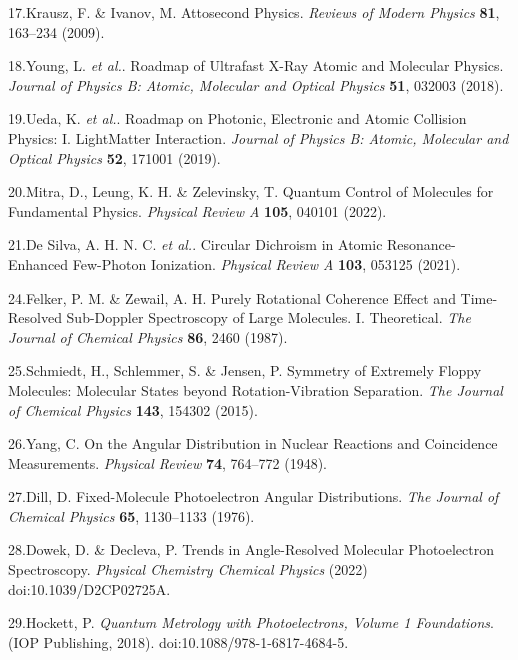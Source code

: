 \documentclass[10pt]{article}
\begin{document}
\label{csl:17}17.Krausz, F. \& Ivanov, M. {Attosecond Physics}. \textit{Reviews of Modern Physics} \textbf{81}, 163–234 (2009).

\label{csl:18}18.Young, L. \textit{et al.}. {Roadmap of Ultrafast X-Ray Atomic and Molecular Physics}. \textit{Journal of Physics B: Atomic, Molecular and Optical Physics} \textbf{51}, 032003 (2018).

\label{csl:19}19.Ueda, K. \textit{et al.}. {Roadmap on Photonic, Electronic and Atomic Collision Physics: {{I}}. {{Light}}\textendash Matter Interaction}. \textit{Journal of Physics B: Atomic, Molecular and Optical Physics} \textbf{52}, 171001 (2019).

\label{csl:20}20.Mitra, D., Leung, K. H. \& Zelevinsky, T. {Quantum Control of Molecules for Fundamental Physics}. \textit{Physical Review A} \textbf{105}, 040101 (2022).

\label{csl:21}21.De Silva, A. H. N. C. \textit{et al.}. {Circular Dichroism in Atomic Resonance-Enhanced Few-Photon Ionization}. \textit{Physical Review A} \textbf{103}, 053125 (2021).

\label{csl:24}24.Felker, P. M. \& Zewail, A. H. {Purely Rotational Coherence Effect and Time-Resolved Sub-{{Doppler}} Spectroscopy of Large Molecules. {{I}}. {{Theoretical}}}. \textit{The Journal of Chemical Physics} \textbf{86}, 2460 (1987).

\label{csl:25}25.Schmiedt, H., Schlemmer, S. \& Jensen, P. {Symmetry of Extremely Floppy Molecules: {{Molecular}} States beyond Rotation-Vibration Separation}. \textit{The Journal of Chemical Physics} \textbf{143}, 154302 (2015).

\label{csl:26}26.Yang, C. {On the {{Angular Distribution}} in {{Nuclear Reactions}} and {{Coincidence Measurements}}}. \textit{Physical Review} \textbf{74}, 764–772 (1948).

\label{csl:27}27.Dill, D. {Fixed-Molecule Photoelectron Angular Distributions}. \textit{The Journal of Chemical Physics} \textbf{65}, 1130–1133 (1976).

\label{csl:28}28.Dowek, D. \& Decleva, P. {Trends in Angle-Resolved Molecular Photoelectron Spectroscopy}. \textit{Physical Chemistry Chemical Physics} (2022) doi:10.1039/D2CP02725A.

\label{csl:29}29.Hockett, P. \textit{{Quantum {{Metrology}} with {{Photoelectrons}}, {{Volume}} 1 {{Foundations}}}}. ({IOP Publishing}, 2018). doi:10.1088/978-1-6817-4684-5.
\end{document}
